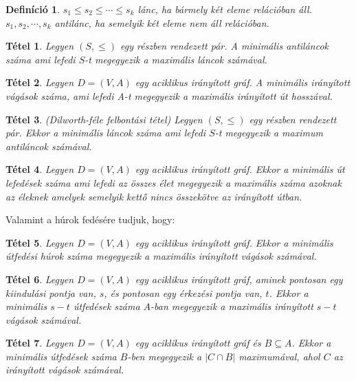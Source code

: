 \documentclass[12pt]{article}
\newtheorem{defin}{Definíció}[section]
\newtheorem{tetel}{Tétel}[section]
\begin{document}
\begin{defin}
$s_1 \leq s_2 \leq \cdots \leq s_k$ lánc, ha bármely két eleme relációban áll. $s_1,s_2, \cdots ,s_k$ antilánc, ha semelyik két eleme nem áll relációban. ~\cite{bomze1999maximum}
\end{defin}

\begin{tetel}
Legyen $(S, \leq)$ egy részben rendezett pár. A minimális antiláncok száma ami lefedi $S$-t megegyezik a maximális láncok számával. ~\cite{bomze1999maximum}
\end{tetel}

\begin{tetel}
Legyen $D = (V,A)$ egy  aciklikus irányított gráf. A minimális irányított vágások száma, ami lefedi A-t megegyezik a maximális irányított út hosszával. ~\cite{bomze1999maximum}
\end{tetel}

\begin{tetel}
(Dilworth-féle felbontási tétel) Legyen $(S, \leq)$ egy részben rendezett pár. Ekkor a minimális láncok száma ami lefedi $S$-t megegyezik a maximum antiláncok számával. ~\cite{bomze1999maximum}
\end{tetel}

\begin{tetel}
Legyen $D = (V,A)$ egy aciklikus irányított gráf. Ekkor a minimális út lefedések száma ami lefedi az összes élet megegyezik a maximális száma azoknak az éleknek amelyek semelyik kettő nincs összekötve az irányított útban. ~\cite{bomze1999maximum}
\end{tetel}

Valamint a húrok fedésére tudjuk, hogy:

\begin{tetel}
Legyen $D = (V,A)$ egy aciklikus irányított gráf. Ekkor a minimális útfedési húrok száma megegyezik a maximális irányított vágások számával. ~\cite{bomze1999maximum}
\end{tetel}

\begin{tetel}
Legyen $D = (V,A)$ egy aciklikus irányított gráf, aminek pontosan egy kiindulási pontja van, $s$, és pontosan egy érkezési pontja van, $t$. Ekkor a minimális $s - t$ útfedések száma $A$-ban megegyezik a maximális irányított $s - t$ vágások számával. ~\cite{bomze1999maximum}
\end{tetel}

\begin{tetel}
Legyen $D = (V,A)$ egy aciklikus irányított gráf és $B \subseteq A$. Ekkor a minimális útfedések száma $B$-ben megegyezik a $|C \cap B|$ maximumával, ahol $C$ az irányított vágások számával. ~\cite{bomze1999maximum}
\end{tetel}
\end{document}
